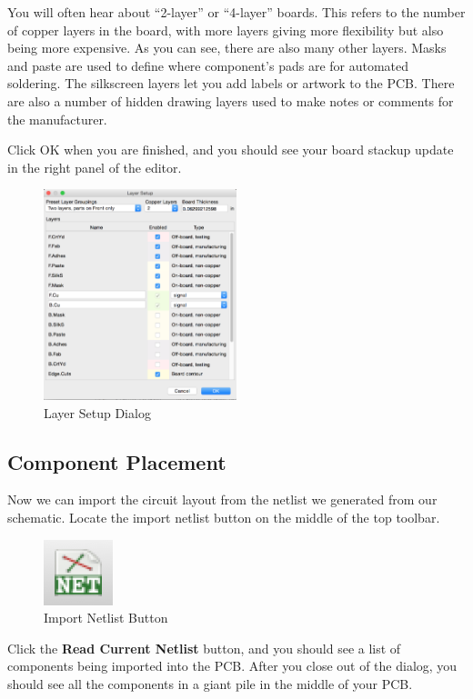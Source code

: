 \documentclass[12pt, oneside]{article}
\begin{document}
You will often hear about ``2-layer'' or ``4-layer'' boards. This refers to the number of copper layers in the board, with more layers giving more flexibility but also being more expensive. As you can see, there are also many other layers. Masks and paste are used to define where component's pads are for automated soldering. The silkscreen layers let you add labels or artwork to the PCB. There are also a number of hidden drawing layers used to make notes or comments for the manufacturer. 

Click OK when you are finished, and you should see your board stackup update in the right panel of the editor.

\begin{figure}[H]
\includegraphics[width=0.5\textwidth]{LayerSetup}
\centering
\caption{Layer Setup Dialog}
\end{figure}

\subsection{Component Placement}
Now we can import the circuit layout from the netlist we generated from our schematic. Locate the import netlist button on the middle of the top toolbar. 

\begin{figure}[H]
\includegraphics{NetlistButton}
\centering
\caption{Import Netlist Button}
\end{figure}

Click the \textbf{Read Current Netlist} button, and you should see a list of components being imported into the PCB. After you close out of the dialog, you should see all the components in a giant pile in the middle of your PCB.
\end{document}
